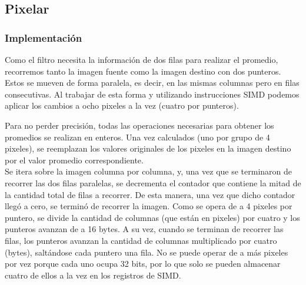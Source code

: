 \documentclass[a4paper]{article}
\begin{document}
\newpage

\subsection{Pixelar}
\subsubsection{Implementación}
Como el filtro necesita la información de dos filas para realizar el promedio, recorremos tanto la imagen fuente como la imagen destino con dos punteros. Estos se mueven de forma paralela, es decir, en las mismas columnas pero en filas consecutivas. Al trabajar de esta forma y utilizando instrucciones SIMD podemos aplicar los cambios a ocho pixeles a la vez (cuatro por punteros).

Para no perder precisión, todas las operaciones necesarias para obtener los promedios se realizan en enteros. Una vez calculados (uno por grupo de 4 pixeles), se reemplazan los valores originales de los pixeles en la imagen destino por el valor promedio correspondiente.
\\

Se itera sobre la imagen columna por columna, y, una vez que se terminaron de recorrer las dos filas paralelas, se decrementa el contador que contiene la mitad de la cantidad total de filas a recorrer. De esta manera, una vez que dicho contador llegó a cero, se terminó de recorrer la imagen. Como se opera de a 4 pixeles por puntero, se divide la cantidad de columnas (que están en pixeles) por cuatro y los punteros avanzan de a 16 bytes. A su vez, cuando se terminan de recorrer las filas, los punteros avanzan la cantidad de columnas multiplicado por cuatro (bytes), saltándose cada puntero una fila. No se puede operar de a más pixeles por vez porque cada uno ocupa 32 bits, por lo que solo se pueden almacenar cuatro de ellos a la vez en los registros de SIMD.
\\
\end{document}
